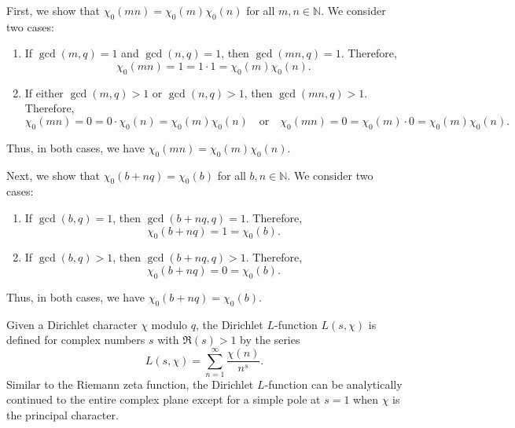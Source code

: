 \documentclass{elegantbook}
\begin{document}
\begin{solution}
  First, we show that $\chi_0(mn) = \chi_0(m) \chi_0(n)$ for all $m, n \in \mathbb{N}$. We consider two cases:
  \begin{enumerate}[(C1)]
    \item If $\gcd(m, q) = 1$ and $\gcd(n, q) = 1$, then $\gcd(mn, q) = 1$. Therefore,
    \[
      \chi_0(mn) = 1 = 1 \cdot 1 = \chi_0(m) \chi_0(n).
    \]
    \item If either $\gcd(m, q) > 1$ or $\gcd(n, q) > 1$, then $\gcd(mn, q) > 1$. Therefore,
    \[
      \chi_0(mn) = 0 = 0 \cdot \chi_0(n) = \chi_0(m) \chi_0(n) \quad \text{or} \quad \chi_0(mn) = 0 = \chi_0(m) \cdot 0 = \chi_0(m) \chi_0(n).
    \]
  \end{enumerate}
  Thus, in both cases, we have $\chi_0(mn) = \chi_0(m) \chi_0(n)$.

  Next, we show that $\chi_0(b+nq) = \chi_0(b)$ for all $b, n \in \mathbb{N}$. We consider two cases:
  \begin{enumerate}[(C1)]
    \item If $\gcd(b, q) = 1$, then $\gcd(b+nq, q) = 1$. Therefore,
    \[
      \chi_0(b+nq) = 1 = \chi_0(b).
    \]
    \item If $\gcd(b, q) > 1$, then $\gcd(b+nq, q) > 1$. Therefore,
    \[
      \chi_0(b+nq) = 0 = \chi_0(b).
    \]
  \end{enumerate}
  Thus, in both cases, we have $\chi_0(b+nq) = \chi_0(b)$.
\end{solution}

\begin{definition}
  Given a Dirichlet character $\chi$ modulo $q$, the Dirichlet $L$-function $L(s, \chi)$ is defined for complex numbers $s$ with $\Re(s) > 1$ by the series
  \[
    L(s, \chi) = \sum_{n=1}^{\infty} \frac{\chi(n)}{n^s}.
  \]
  Similar to the Riemann zeta function, the Dirichlet $L$-function can be analytically continued to the entire complex plane except for a simple pole at $s=1$ when $\chi$ is the principal character.
\end{definition}

\section{}
\end{document}
